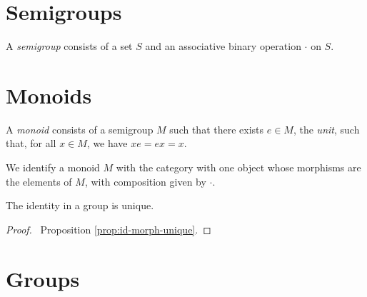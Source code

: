 \chapter{Semigroups}

\begin{df}[Semigroup]
A \emph{semigroup} consists of a set $S$ and an associative binary operation $\cdot$ on $S$.
\end{df}

\chapter{Monoids}

\begin{df}[Monoid]
A \emph{monoid} consists of a semigroup $M$ such that there exists $e \in M$, the \emph{unit}, such that, for all $x \in M$, we have $x e = ex = x$.

We identify a monoid $M$ with the category with one object whose morphisms are the elements of $M$, with composition given by $\cdot$.
\end{df}

\begin{prop}
    The identity in a group is unique.
\end{prop}

\begin{proof}
    \pf\ Proposition \ref{prop:id-morph-unique}.
\end{proof}

\chapter{Groups}

